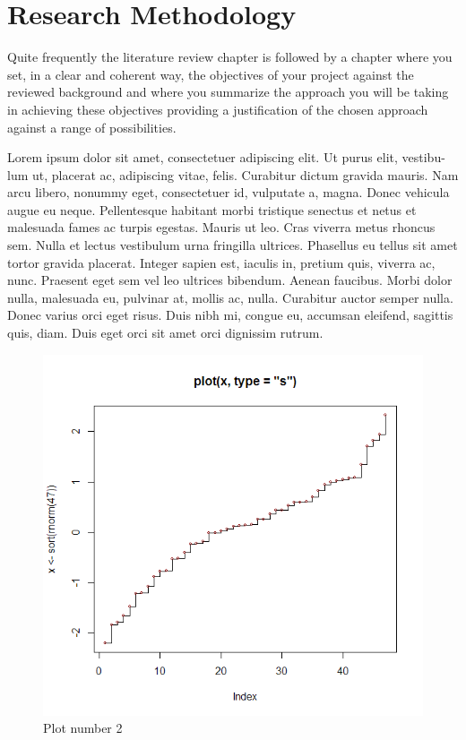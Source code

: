 \chapter{Research Methodology}
Quite frequently the literature review chapter is followed by a chapter where you set, in a clear
and coherent way, the objectives of your project against the reviewed background and where
you summarize the approach you will be taking in achieving these objectives providing a
justification of the chosen approach against a range of possibilities.

Lorem ipsum dolor sit amet, consectetuer adipiscing elit. Ut purus elit, vestibu-
lum ut, placerat ac, adipiscing vitae, felis. Curabitur dictum gravida mauris.
Nam arcu libero, nonummy eget, consectetuer id, vulputate a, magna. Donec
vehicula augue eu neque. Pellentesque habitant morbi tristique senectus et netus
et malesuada fames ac turpis egestas. Mauris ut leo. Cras viverra metus rhoncus
sem. Nulla et lectus vestibulum urna fringilla ultrices. Phasellus eu tellus sit
amet tortor gravida placerat. Integer sapien est, iaculis in, pretium quis, viverra
ac, nunc. Praesent eget sem vel leo ultrices bibendum. Aenean faucibus. Morbi
dolor nulla, malesuada eu, pulvinar at, mollis ac, nulla. Curabitur auctor semper
nulla. Donec varius orci eget risus. Duis nibh mi, congue eu, accumsan eleifend,
sagittis quis, diam. Duis eget orci sit amet orci dignissim rutrum.

\begin{figure}
\includegraphics[width=0.9\linewidth]{./images/plottest02} 
\caption{Plot number 2}
\label{fig:plot02}
\end{figure}

